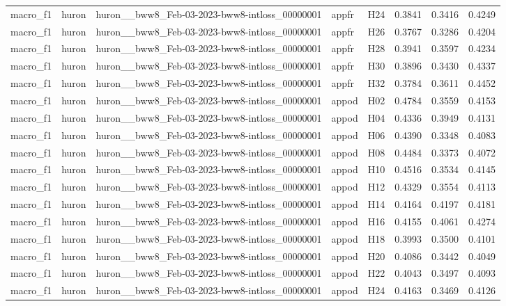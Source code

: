 \begin{table}[tbp]
\begin{tabular}{lllllrrr}
macro\_f1 & huron & huron\_\_bww8\_Feb-03-2023-bww8-intloss\_00000001 & appfr & H24 & 0.3841 & 0.3416 & 0.4249 \\
macro\_f1 & huron & huron\_\_bww8\_Feb-03-2023-bww8-intloss\_00000001 & appfr & H26 & 0.3767 & 0.3286 & 0.4204 \\
macro\_f1 & huron & huron\_\_bww8\_Feb-03-2023-bww8-intloss\_00000001 & appfr & H28 & 0.3941 & 0.3597 & 0.4234 \\
macro\_f1 & huron & huron\_\_bww8\_Feb-03-2023-bww8-intloss\_00000001 & appfr & H30 & 0.3896 & 0.3430 & 0.4337 \\
macro\_f1 & huron & huron\_\_bww8\_Feb-03-2023-bww8-intloss\_00000001 & appfr & H32 & 0.3784 & 0.3611 & 0.4452 \\
macro\_f1 & huron & huron\_\_bww8\_Feb-03-2023-bww8-intloss\_00000001 & appod & H02 & 0.4784 & 0.3559 & 0.4153 \\
macro\_f1 & huron & huron\_\_bww8\_Feb-03-2023-bww8-intloss\_00000001 & appod & H04 & 0.4336 & 0.3949 & 0.4131 \\
macro\_f1 & huron & huron\_\_bww8\_Feb-03-2023-bww8-intloss\_00000001 & appod & H06 & 0.4390 & 0.3348 & 0.4083 \\
macro\_f1 & huron & huron\_\_bww8\_Feb-03-2023-bww8-intloss\_00000001 & appod & H08 & 0.4484 & 0.3373 & 0.4072 \\
macro\_f1 & huron & huron\_\_bww8\_Feb-03-2023-bww8-intloss\_00000001 & appod & H10 & 0.4516 & 0.3534 & 0.4145 \\
macro\_f1 & huron & huron\_\_bww8\_Feb-03-2023-bww8-intloss\_00000001 & appod & H12 & 0.4329 & 0.3554 & 0.4113 \\
macro\_f1 & huron & huron\_\_bww8\_Feb-03-2023-bww8-intloss\_00000001 & appod & H14 & 0.4164 & 0.4197 & 0.4181 \\
macro\_f1 & huron & huron\_\_bww8\_Feb-03-2023-bww8-intloss\_00000001 & appod & H16 & 0.4155 & 0.4061 & 0.4274 \\
macro\_f1 & huron & huron\_\_bww8\_Feb-03-2023-bww8-intloss\_00000001 & appod & H18 & 0.3993 & 0.3500 & 0.4101 \\
macro\_f1 & huron & huron\_\_bww8\_Feb-03-2023-bww8-intloss\_00000001 & appod & H20 & 0.4086 & 0.3442 & 0.4049 \\
macro\_f1 & huron & huron\_\_bww8\_Feb-03-2023-bww8-intloss\_00000001 & appod & H22 & 0.4043 & 0.3497 & 0.4093 \\
macro\_f1 & huron & huron\_\_bww8\_Feb-03-2023-bww8-intloss\_00000001 & appod & H24 & 0.4163 & 0.3469 & 0.4126 \\

\end{tabular}
\end{table}
